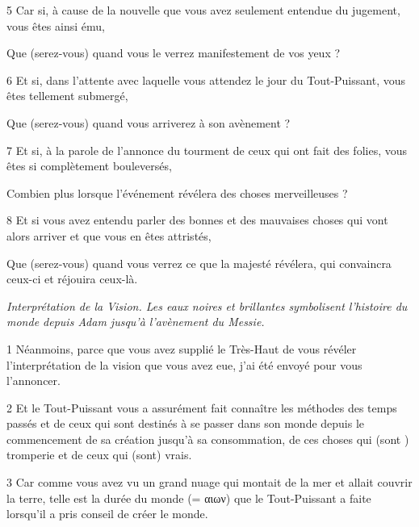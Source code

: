 \par 5 Car si, à cause de la nouvelle que vous avez seulement entendue du jugement, vous êtes ainsi ému,

\par Que (serez-vous) quand vous le verrez manifestement de vos yeux ?

\par 6 Et si, dans l'attente avec laquelle vous attendez le jour du Tout-Puissant, vous êtes tellement submergé,

\par Que (serez-vous) quand vous arriverez à son avènement ?

\par 7 Et si, à la parole de l'annonce du tourment de ceux qui ont fait des folies, vous êtes si complètement bouleversés,

\par Combien plus lorsque l'événement révélera des choses merveilleuses ?

\par 8 Et si vous avez entendu parler des bonnes et des mauvaises choses qui vont alors arriver et que vous en êtes attristés,

\par Que (serez-vous) quand vous verrez ce que la majesté révélera, qui convaincra ceux-ci et réjouira ceux-là.


\par \textit{Interprétation de la Vision. Les eaux noires et brillantes symbolisent l'histoire du monde depuis Adam jusqu'à l'avènement du Messie.}


\par 1 Néanmoins, parce que vous avez supplié le Très-Haut de vous révéler l'interprétation de la vision que vous avez eue, j'ai été envoyé pour vous l'annoncer.

\par 2 Et le Tout-Puissant vous a assurément fait connaître les méthodes des temps passés et de ceux qui sont destinés à se passer dans son monde depuis le commencement de sa création jusqu'à sa consommation, de ces choses qui (sont ) tromperie et de ceux qui (sont) vrais.

\par 3 Car comme vous avez vu un grand nuage qui montait de la mer et allait couvrir la terre, telle est la durée du monde (= αιων) que le Tout-Puissant a faite lorsqu'il a pris conseil de créer le monde.

